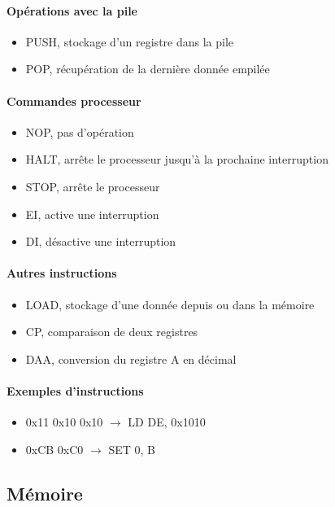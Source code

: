 \documentclass[a4paper]{article}
\begin{document}
\paragraph{Opérations avec la pile}
\begin{itemize}[label=\textbullet]
	\item PUSH, stockage d'un registre dans la pile
	\item POP, récupération de la dernière donnée empilée
\end{itemize}
\paragraph{Commandes processeur}
\begin{itemize}[label=\textbullet]
	\item NOP, pas d'opération
	\item HALT, arrête le processeur jusqu'à la prochaine interruption
	\item STOP, arrête le processeur
	\item EI, active une interruption
	\item DI, désactive une interruption
\end{itemize}
\paragraph{Autres instructions}
\begin{itemize}[label=\textbullet]
	\item LOAD, stockage d'une donnée depuis ou dans la mémoire
	\item CP, comparaison de deux registres
	\item DAA, conversion du registre A en décimal
\end{itemize}
\newpage

\paragraph{Exemples d'instructions}
\begin{itemize}[label=\textbullet]
	\item 0x11 0x10 0x10 $\rightarrow$ LD DE, 0x1010
	\item 0xCB 0xC0 $\rightarrow$ SET 0, B
\end{itemize}


\subsection{Mémoire}
\end{document}
